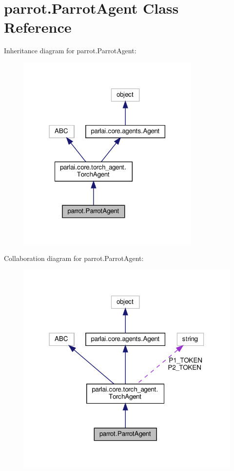 \hypertarget{classparrot_1_1ParrotAgent}{}\section{parrot.\+Parrot\+Agent Class Reference}
\label{classparrot_1_1ParrotAgent}


Inheritance diagram for parrot.\+Parrot\+Agent\+:
\nopagebreak
\begin{figure}[H]
\begin{center}
\leavevmode
\includegraphics[width=258pt]{classparrot_1_1ParrotAgent__inherit__graph}
\end{center}
\end{figure}


Collaboration diagram for parrot.\+Parrot\+Agent\+:
\nopagebreak
\begin{figure}[H]
\begin{center}
\leavevmode
\includegraphics[width=318pt]{classparrot_1_1ParrotAgent__coll__graph}
\end{center}
\end{figure}

